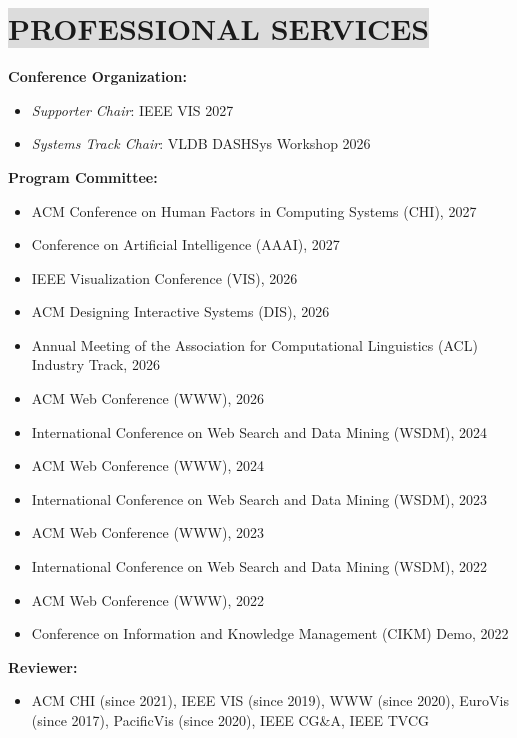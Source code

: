 \section*{
    \colorbox{gainsboro}{PROFESSIONAL SERVICES}
}
\textbf{Conference Organization:}
\vspace{-3mm}
\begin{itemize}[leftmargin=5mm,noitemsep,itemsep=0pt]
    \item \textit{Supporter Chair}: IEEE VIS 2027
    \item \textit{Systems Track Chair}: VLDB DASHSys Workshop 2026
\end{itemize}    
\textbf{Program Committee:}
\vspace{-3mm}
\begin{itemize}[leftmargin=5mm,noitemsep,itemsep=0pt]
    \item ACM Conference on Human Factors in Computing Systems (CHI), 2027
    \item Conference on Artificial Intelligence (AAAI), 2027
    \item IEEE Visualization Conference (VIS), 2026
    \item ACM Designing Interactive Systems (DIS), 2026
    \item Annual Meeting of the Association for Computational Linguistics (ACL) Industry Track, 2026
    \item ACM Web Conference (WWW), 2026
    \item International Conference on Web Search and Data Mining (WSDM), 2024
    \item ACM Web Conference (WWW), 2024
    \item International Conference on Web Search and Data Mining (WSDM), 2023
    \item ACM Web Conference (WWW), 2023
    \item International Conference on Web Search and Data Mining (WSDM), 2022
    \item ACM Web Conference (WWW), 2022
    \item Conference on Information and Knowledge Management (CIKM) Demo, 2022
     
\end{itemize}

\textbf{Reviewer:}
\vspace{-3mm}
\begin{itemize}[leftmargin=5mm,noitemsep,itemsep=0pt]
    \item ACM CHI (since 2021), IEEE VIS (since 2019), WWW (since 2020), EuroVis (since 2017), PacificVis (since 2020), IEEE CG\&A, IEEE TVCG
\end{itemize}

